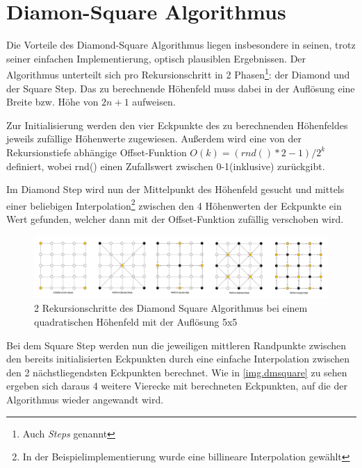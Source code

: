 \chapter{Diamon-Square Algorithmus}
Die Vorteile des Diamond-Square Algorithmus liegen insbesondere in seinen, trotz seiner einfachen Implementierung, optisch plausiblen Ergebnissen. 
Der Algorithmus unterteilt sich pro Rekursionschritt in 2 Phasen\footnote{Auch \emph{Steps} genannt}: der Diamond und der Square Step. Das zu berechnende Höhenfeld muss dabei in der Auflösung eine Breite bzw. Höhe von $2n+1$ aufweisen.

Zur Initialisierung werden den vier Eckpunkte des zu berechnenden Höhenfeldes jeweils zufällige Höhenwerte zugewiesen. Außerdem wird eine von der Rekursionstiefe abhängige Offset-Funktion $O(k)=(rnd()*2-1)/2^k$ definiert, wobei rnd() einen Zufallswert zwischen 0-1(inklusive) zurückgibt.

Im Diamond Step wird nun der Mittelpunkt des Höhenfeld gesucht und mittels einer beliebigen Interpolation\footnote{In der Beispielimplementierung wurde eine billineare Interpolation gewählt} zwischen den 4 Höhenwerten der Eckpunkte ein Wert gefunden, welcher dann mit der Offset-Funktion zufällig verschoben wird.
\begin{figure}
	\centering
	\includegraphics[width=\textwidth]{images/Diamond_Square.png}
	\caption{2 Rekursionschritte des Diamond Square Algorithmus bei einem quadratischen Höhenfeld mit der Auflösung 5x5}\label{img.dmsquare}
\end{figure}
Bei dem Square Step werden nun die jeweiligen mittleren Randpunkte zwischen den bereits initialisierten Eckpunkten durch eine einfache Interpolation zwischen den 2 nächstliegendsten Eckpunkten berechnet.
Wie in \autoref{img.dmsquare} zu sehen ergeben sich daraus 4 weitere Vierecke mit berechneten Eckpunkten, auf die der Algorithmus wieder angewandt wird.
